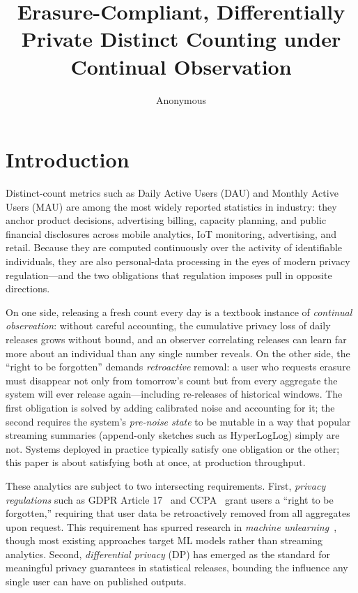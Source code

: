 \documentclass[sigconf,anonymous,review]{acmart}
\title{Erasure-Compliant, Differentially Private Distinct Counting under Continual Observation}
\author{Anonymous}
\affiliation{%
  \institution{Anonymous Institution}
  \city{}
  \state{}
  \country{}
}
\begin{document}
\maketitle
{}
\makeatletter\@ACM@printacmreftrue\makeatother
\section{Introduction}

Distinct-count metrics such as Daily Active Users (DAU) and Monthly Active Users (MAU) are among the most widely reported statistics in industry: they anchor product decisions, advertising billing, capacity planning, and public financial disclosures across mobile analytics, IoT monitoring, advertising, and retail. Because they are computed continuously over the activity of identifiable individuals, they are also personal-data processing in the eyes of modern privacy regulation---and the two obligations that regulation imposes pull in opposite directions.

On one side, releasing a fresh count every day is a textbook instance of \emph{continual observation}: without careful accounting, the cumulative privacy loss of daily releases grows without bound, and an observer correlating releases can learn far more about an individual than any single number reveals. On the other side, the ``right to be forgotten'' demands \emph{retroactive} removal: a user who requests erasure must disappear not only from tomorrow's count but from every aggregate the system will ever release again---including re-releases of historical windows. The first obligation is solved by adding calibrated noise and accounting for it; the second requires the system's \emph{pre-noise state} to be mutable in a way that popular streaming summaries (append-only sketches such as HyperLogLog) simply are not. Systems deployed in practice typically satisfy one obligation or the other; this paper is about satisfying both at once, at production throughput.

These analytics are subject to two intersecting requirements. First, \emph{privacy regulations} such as GDPR Article 17~\cite{GDPR} and CCPA~\cite{CCPA} grant users a ``right to be forgotten,'' requiring that user data be retroactively removed from all aggregates upon request. This requirement has spurred research in \emph{machine unlearning}~\cite{Bourtoule2021, Cao2015, Ginart2019}, though most existing approaches target ML models rather than streaming analytics. Second, \emph{differential privacy} (DP) has emerged as the standard for meaningful privacy guarantees in statistical releases, bounding the influence any single user can have on published outputs.
\end{document}
